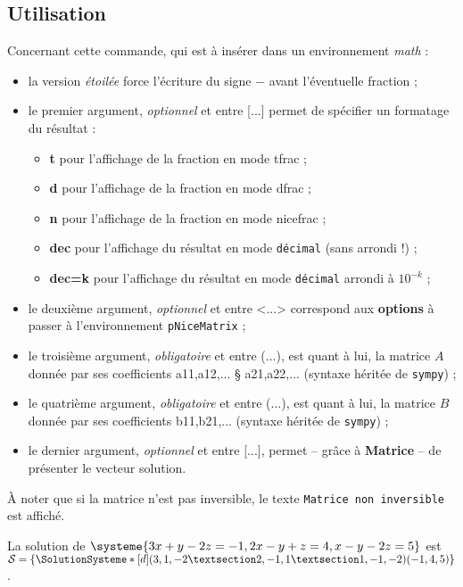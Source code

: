 \documentclass[a4paper,11pt]{article}
\newcommand\Cle[1]{{\bfseries\sffamily\textlangle #1\textrangle}}
\begin{document}
\subsection{Utilisation}

\begin{tipblock}
Concernant cette commande, qui est à insérer dans un environnement \textit{math} :

\begin{itemize}
	\item la version \textit{étoilée} force l'écriture du signe \og $-$ \fg{} avant l'éventuelle fraction ;
	\item le premier argument, \textit{optionnel} et entre \textsf{[...]} permet de spécifier un formatage du résultat :
	\begin{itemize}
		\item \Cle{t} pour l'affichage de la fraction en mode \textsf{tfrac} ;
		\item \Cle{d} pour l'affichage de la fraction en mode \textsf{dfrac} ;
		\item \Cle{n} pour l'affichage de la fraction en mode \textsf{nicefrac} ;
		\item \Cle{dec} pour l'affichage du résultat en mode \texttt{décimal} (sans arrondi !) ;
		\item \Cle{dec=k} pour l'affichage du résultat en mode \texttt{décimal} arrondi à $10^{-k}$ ;
	\end{itemize}
	\item le deuxième argument, \textit{optionnel} et entre \textsf{<...>} correspond aux \Cle{options} à passer à l'environnement \texttt{pNiceMatrix} ;
	\item le troisième argument, \textit{obligatoire} et entre \textsf{(...)}, est quant à lui, la matrice $A$ donnée par ses coefficients \textsf{a11,a12,... § a21,a22,...} (syntaxe héritée de \texttt{sympy}) ;
	\item le quatrième argument, \textit{obligatoire} et entre \textsf{(...)}, est quant à lui, la matrice $B$ donnée par ses coefficients \textsf{b11,b21,...} (syntaxe héritée de \texttt{sympy}) ;
	\item le dernier argument, \textit{optionnel} et entre \textsf{[...]}, permet -- grâce à \Cle{Matrice} -- de présenter le vecteur solution.
\end{itemize}
À noter que si la matrice n'est pas inversible, le texte \texttt{Matrice non inversible} est affiché.
\end{tipblock}

\begin{PresentationCode}{}
La solution de $\systeme{3x+y-2z=-1,2x-y+z=4,x-y-2z=5}$ est $\mathcal{S}=%
\left\lbrace \SolutionSysteme*[d](3,1,-2 § 2,-1,1 § 1,-1,-2)(-1,4,5) \right\rbrace$.\\
\end{PresentationCode}
\end{document}

